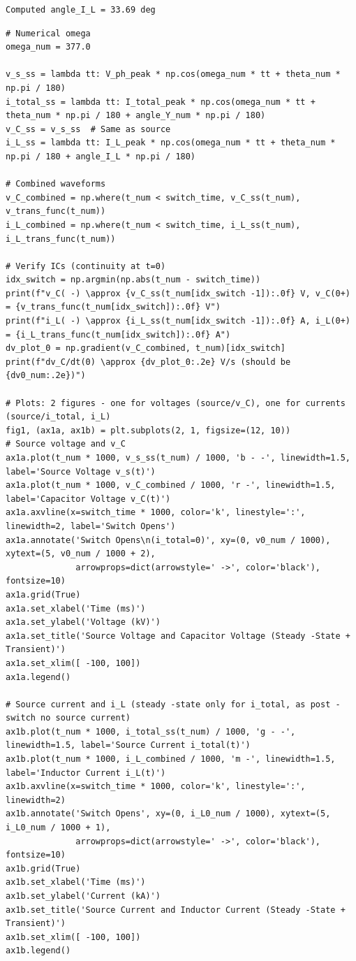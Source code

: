 \begin{verbatim}
Computed angle_I_L = 33.69 deg
\end{verbatim}

\begin{verbatim}
# Numerical omega
omega_num = 377.0

v_s_ss = lambda tt: V_ph_peak * np.cos(omega_num * tt + theta_num * np.pi / 180)
i_total_ss = lambda tt: I_total_peak * np.cos(omega_num * tt + theta_num * np.pi / 180 + angle_Y_num * np.pi / 180)
v_C_ss = v_s_ss  # Same as source
i_L_ss = lambda tt: I_L_peak * np.cos(omega_num * tt + theta_num * np.pi / 180 + angle_I_L * np.pi / 180)

# Combined waveforms
v_C_combined = np.where(t_num < switch_time, v_C_ss(t_num), v_trans_func(t_num))
i_L_combined = np.where(t_num < switch_time, i_L_ss(t_num), i_L_trans_func(t_num))

# Verify ICs (continuity at t=0)
idx_switch = np.argmin(np.abs(t_num - switch_time))
print(f"v_C( -) \approx {v_C_ss(t_num[idx_switch -1]):.0f} V, v_C(0+) = {v_trans_func(t_num[idx_switch]):.0f} V")
print(f"i_L( -) \approx {i_L_ss(t_num[idx_switch -1]):.0f} A, i_L(0+) = {i_L_trans_func(t_num[idx_switch]):.0f} A")
dv_plot_0 = np.gradient(v_C_combined, t_num)[idx_switch]
print(f"dv_C/dt(0) \approx {dv_plot_0:.2e} V/s (should be {dv0_num:.2e})")

# Plots: 2 figures - one for voltages (source/v_C), one for currents (source/i_total, i_L)
fig1, (ax1a, ax1b) = plt.subplots(2, 1, figsize=(12, 10))
# Source voltage and v_C
ax1a.plot(t_num * 1000, v_s_ss(t_num) / 1000, 'b - -', linewidth=1.5, label='Source Voltage v_s(t)')
ax1a.plot(t_num * 1000, v_C_combined / 1000, 'r -', linewidth=1.5, label='Capacitor Voltage v_C(t)')
ax1a.axvline(x=switch_time * 1000, color='k', linestyle=':', linewidth=2, label='Switch Opens')
ax1a.annotate('Switch Opens\n(i_total=0)', xy=(0, v0_num / 1000), xytext=(5, v0_num / 1000 + 2),
              arrowprops=dict(arrowstyle=' ->', color='black'), fontsize=10)
ax1a.grid(True)
ax1a.set_xlabel('Time (ms)')
ax1a.set_ylabel('Voltage (kV)')
ax1a.set_title('Source Voltage and Capacitor Voltage (Steady -State + Transient)')
ax1a.set_xlim([ -100, 100])
ax1a.legend()

# Source current and i_L (steady -state only for i_total, as post -switch no source current)
ax1b.plot(t_num * 1000, i_total_ss(t_num) / 1000, 'g - -', linewidth=1.5, label='Source Current i_total(t)')
ax1b.plot(t_num * 1000, i_L_combined / 1000, 'm -', linewidth=1.5, label='Inductor Current i_L(t)')
ax1b.axvline(x=switch_time * 1000, color='k', linestyle=':', linewidth=2)
ax1b.annotate('Switch Opens', xy=(0, i_L0_num / 1000), xytext=(5, i_L0_num / 1000 + 1),
              arrowprops=dict(arrowstyle=' ->', color='black'), fontsize=10)
ax1b.grid(True)
ax1b.set_xlabel('Time (ms)')
ax1b.set_ylabel('Current (kA)')
ax1b.set_title('Source Current and Inductor Current (Steady -State + Transient)')
ax1b.set_xlim([ -100, 100])
ax1b.legend()


\end{verbatim}
